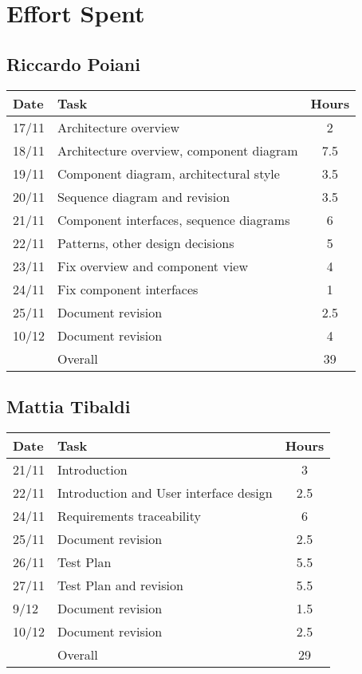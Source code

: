 \section{Effort Spent}

\subsection{Riccardo Poiani}

\begin{table}[H]
\begin{tabularx}{\textwidth}{|l|X|c|}
\hline
\rowcolor[HTML]{C0C0C0} 
Date & Task & Hours\\ \hline
17/11 & Architecture overview & 2\\ \hline
18/11 & Architecture overview, component diagram & 7.5 \\ \hline
19/11 & Component diagram, architectural style & 3.5\\ \hline
20/11 & Sequence diagram and revision & 3.5\\ \hline
21/11 & Component interfaces, sequence diagrams & 6\\ \hline
22/11 & Patterns, other design decisions & 5 \\ \hline
23/11 & Fix overview and component view & 4  \\  \hline
24/11 & Fix component interfaces & 1 \\ \hline
25/11 & Document revision & 2.5 \\ \hline
10/12 & Document revision & 4 \\ \hline
\rowcolor[HTML]{C0C0C0} 
& Overall & 39 \\ \hline
\end{tabularx}
\end{table}

\subsection{Mattia Tibaldi}

\begin{table}[H]
\begin{tabularx}{\textwidth}{|l|X|c|}
\hline
\rowcolor[HTML]{C0C0C0} 
Date & Task & Hours\\ \hline
21/11 & Introduction & 3 \\ \hline
22/11 & Introduction and User interface design & 2.5 \\ \hline
24/11 & Requirements traceability & 6 \\ \hline 
25/11 & Document revision & 2.5 \\ \hline
26/11 & Test Plan & 5.5\\ \hline
27/11 & Test Plan and revision & 5.5\\ \hline
9/12 & Document revision & 1.5\\ \hline
10/12 & Document revision & 2.5\\ \hline
\rowcolor[HTML]{C0C0C0} 
& Overall & 29\\ \hline
\end{tabularx}
\end{table}


